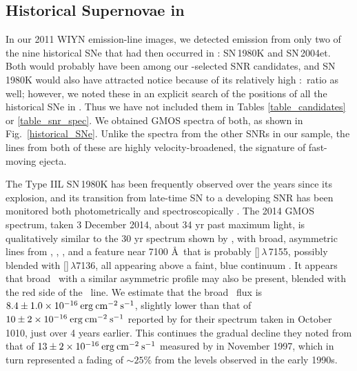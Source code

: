 

\subsection{Historical Supernovae in \gal}
In our 2011 WIYN emission-line images, we detected emission from only two of the nine historical SNe that had then occurred in \gal: SN\,1980K and SN\,2004et.  Both would probably have been among our \sii-selected SNR candidates, and SN\,1980K would also have attracted notice because of its relatively high \oiii:\ha\ ratio as well; however, we noted these in an explicit search of the positions of all the historical SNe in \gal.  Thus we have not included them in Tables \ref{table_candidates} or \ref{table_snr_spec}.
We  obtained GMOS spectra of both, as shown in Fig.~\ref{historical_SNe}.  Unlike the spectra from the other SNRs in our sample, the lines from both of these are highly velocity-broadened, the signature of fast-moving ejecta.

The Type IIL SN\,1980K has been frequently observed over the years since its explosion, and its transition from late-time SN to a developing SNR has been monitored both photometrically and spectroscopically \citep[e.g.,][]{uomoto86, fesen90, fesen94, fesen99b, milisavljevic12}.  The 2014 GMOS spectrum, taken 3 December 2014, about  34 yr past maximum light, is qualitatively similar to the 30 yr spectrum shown by \citet{milisavljevic12}, with broad, asymmetric lines from \ha, \oi, \oiii, and a feature near 7100 \AA\ that is probably []\,$\lambda$\,7155, possibly blended with []\,$\lambda$7136, all appearing above a faint, blue continuum \citep[see][for a discussion of the 7100 \AA\ feature]{fesen94}.  It appears that broad \SiiL\ with a similar asymmetric profile may also be present, blended with the red side of the  \ha\ line.  We estimate that the broad \ha\ flux is $8.4 \pm 1.0 \times 10^{-16} \:{\rm erg\:cm^{-2}\:s^{-1}}$, slightly lower than that of $10 \pm 2 \times 10^{-16} \:{\rm erg\:cm^{-2}\:s^{-1}}$ reported by \citet{milisavljevic12} for their spectrum taken in October 1010, just over 4 years earlier.  This continues the gradual decline they noted from that of $13 \pm 2 \times 10^{-16} \:{\rm erg\:cm^{-2}\:s^{-1}}$ measured by \citet{fesen99b} in November 1997, which in turn represented a fading of $\sim 25\%$ from the levels observed in the early 1990s.

